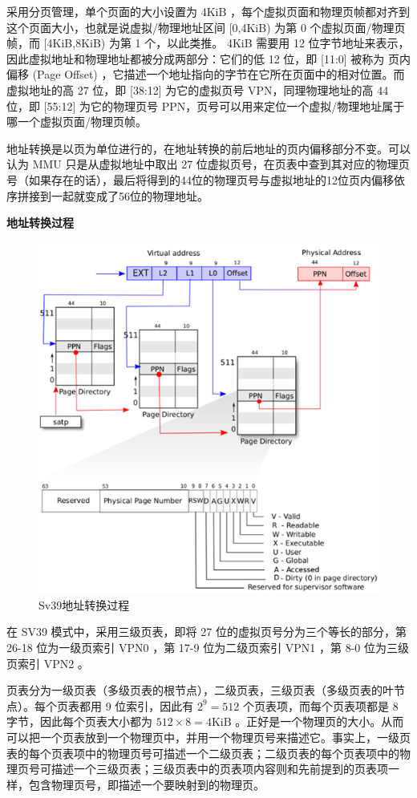 采用分页管理，单个页面的大小设置为 4KiB ，每个虚拟页面和物理页帧都对齐到这个页面大小，也就是说虚拟/物理地址区间 [0,4KiB) 为第 0 个虚拟页面/物理页帧，而 [4KiB,8KiB) 为第 1 个，以此类推。 4KiB 需要用 12 位字节地址来表示，因此虚拟地址和物理地址都被分成两部分：它们的低 12 位，即 [11:0] 被称为 页内偏移 (Page Offset) ，它描述一个地址指向的字节在它所在页面中的相对位置。而虚拟地址的高 27 位，即 [38:12] 为它的虚拟页号 VPN，同理物理地址的高 44 位，即 [55:12] 为它的物理页号 PPN，页号可以用来定位一个虚拟/物理地址属于哪一个虚拟页面/物理页帧。

地址转换是以页为单位进行的，在地址转换的前后地址的页内偏移部分不变。可以认为 MMU 只是从虚拟地址中取出 27 位虚拟页号，在页表中查到其对应的物理页号（如果存在的话），最后将得到的44位的物理页号与虚拟地址的12位页内偏移依序拼接到一起就变成了56位的物理地址。


\textbf{地址转换过程}

\begin{figure}[htb]
    \figureCapSet
    \centering
    \includegraphics[width=.8\linewidth]{figure/c2/addressv2p.png}
    \caption{Sv39地址转换过程}
    \label{figure:c2addressv2p}
\end{figure}

在 SV39 模式中，采用三级页表，即将 27 位的虚拟页号分为三个等长的部分，第 26-18 位为一级页索引 VPN0 ，第 17-9 位为二级页索引 VPN1 ，第 8-0 位为三级页索引 VPN2 。

页表分为一级页表（多级页表的根节点），二级页表，三级页表（多级页表的叶节点）。每个页表都用 9 位索引，因此有 $2^9=512$ 个页表项，而每个页表项都是 8 字节，因此每个页表大小都为 $512\times 8=4 \mathrm{KiB}$ 。正好是一个物理页的大小。从而可以把一个页表放到一个物理页中，并用一个物理页号来描述它。事实上，一级页表的每个页表项中的物理页号可描述一个二级页表；二级页表的每个页表项中的物理页号可描述一个三级页表；三级页表中的页表项内容则和先前提到的页表项一样，包含物理页号，即描述一个要映射到的物理页。


